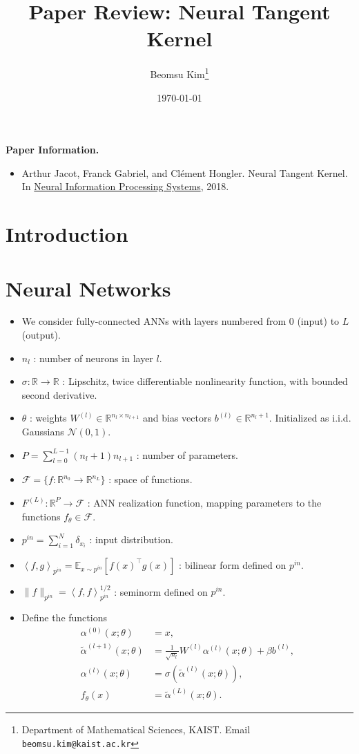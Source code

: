 \documentclass[10pt]{article}
\title{Paper Review: Neural Tangent Kernel}
\author{Beomsu Kim\footnote{Department of Mathematical Sciences, KAIST. Email \texttt{beomsu.kim@kaist.ac.kr}}}
\date{\today}
\newcommand{\RR}{\mathbb{R}}
\newcommand{\EE}{\mathbb{E}}
\newcommand{\FF}{\mathcal{F}}
\newcommand{\NN}{\mathcal{N}}
\newcommand{\inner}[2]{\left\langle #1, #2 \right\rangle}
\newcommand{\paran}[1]{{( #1 )}}
\newcommand{\pin}{{p^{in}}}
\begin{document}
\maketitle

\textbf{Paper Information.}

\begin{itemize}
\item Arthur Jacot, Franck Gabriel, and Cl\'{e}ment Hongler. Neural Tangent Kernel. \newline In \underline{Neural Information Processing Systems}, 2018.
\end{itemize}

\section{Introduction}

\section{Neural Networks}

\begin{itemize}
\item We consider fully-connected ANNs with layers numbered from $0$ (input) to $L$ (output).
\item $n_l$ : number of neurons in layer $l$.
\item $\sigma : \RR \rightarrow \RR$ : Lipschitz, twice differentiable nonlinearity function, with bounded second derivative.
\item $\theta$ : weights $W^\paran{l} \in \RR^{n_l \times n_{l + 1}}$ and bias vectors $b^\paran{l} \in \RR^{n_l + 1}$. Initialized as i.i.d. Gaussians $\NN(0,1)$.
\item $P = \sum_{l = 0}^{L - 1} (n_l + 1) n_{l + 1}$ : number of parameters.
\item $\FF = \{f : \RR^{n_0} \rightarrow \RR^{n_L}\}$ : space of functions.
\item $F^\paran{L} : \RR^P \rightarrow \FF$ : ANN realization function, mapping parameters to the functions $f_\theta \in \FF$.
\item $\pin = \sum_{i = 1}^N \delta_{x_i}$ : input distribution.
\item $\inner{f}{g}_{\pin} = \EE_{x \sim \pin} [f(x)^\top g(x)]$ : bilinear form defined on $\pin$.
\item $\| f \|_{\pin} = \inner{f}{f}_{\pin}^{1/2}$ : seminorm defined on $\pin$.
\item Define the functions
\begin{align*}
\alpha^\paran{0}(x;\theta) &= x, \\
\tilde{\alpha}^\paran{l + 1}(x;\theta) &= \frac{1}{\sqrt{n_l}} W^\paran{l} \alpha^\paran{l}(x;\theta) + \beta b^\paran{l}, \\
\alpha^\paran{l}(x;\theta) &= \sigma(\tilde{\alpha}^\paran{l}(x;\theta)), \\
f_\theta(x) &= \tilde{\alpha}^\paran{L}(x;\theta).
\end{align*}
\end{itemize}
\end{document}
